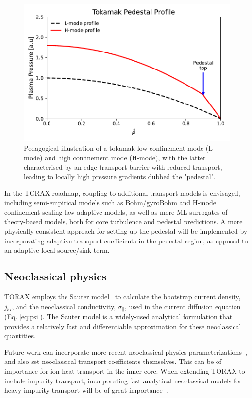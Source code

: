 \documentclass[aps, reprint, nofootinbib]{revtex4-2}
\begin{document}
\begin{figure}[h]
    \includegraphics[width=1.0\linewidth]{figure4_pedestal.pdf}
    \caption{\footnotesize Pedagogical illustration of a tokamak low confinement mode (L-mode) and high confinement mode (H-mode), with the latter characterised by an edge transport barrier with reduced transport, leading to locally high pressure gradients dubbed the "pedestal".}
    \label{fig:pedestal}
\end{figure}

In the TORAX roadmap, coupling to additional transport models is envisaged, including semi-empirical models such as Bohm/gyroBohm and H-mode confinement scaling law adaptive models, as well as more ML-surrogates of theory-based models, both for core turbulence and pedestal predictions. A more physically consistent approach for setting up the pedestal will be implemented by incorporating adaptive transport coefficients in the pedestal region, as opposed to an adaptive local source/sink term.

\subsection{Neoclassical physics}
TORAX employs the Sauter model~\cite{sauter:1999} to calculate the bootstrap current density, $j_{bs}$, and the neoclassical conductivity, $\sigma_{||}$, used in the current diffusion equation (Eq. \ref{eq:psi}). The Sauter model is a widely-used analytical formulation that provides a relatively fast and differentiable approximation for these neoclassical quantities.

Future work can incorporate more recent neoclassical physics parameterizations~\cite{redl:2021}, and also set neoclassical transport coefficients themselves. This can be of importance for ion heat transport in the inner core. When extending TORAX to include impurity transport, incorporating fast analytical neoclassical models for heavy impurity transport will be of great importance~\cite{angioni:2021,fajardo:2023}.
\end{document}
